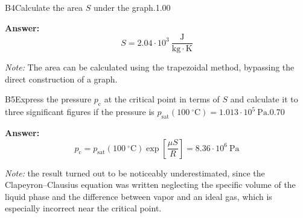 \documentclass[11pt,a4paper]{article}
\begin{document}
\begin{solcard}{B4}{Calculate the area $S$ under the graph.}{1.00}
\par\smallskip\noindent\textbf{Answer:} \[S=2.04\cdot10^3~\frac{\mathrm{J}}{\mathrm{kg}\cdot\mathrm{K}}\] 
\par\smallskip\noindent\textit{Note:} The area can be calculated using the trapezoidal method, bypassing the direct construction of a graph.
\end{solcard}

\begin{solcard}{B5}{Express the pressure $p_\mathrm c$ at the critical point in terms of $S$ and calculate it to three significant figures if the pressure is $p_\text{sat}(100~^\circ\mathrm{C})=1.013\cdot10^5~\text{Pa}$.}{0.70}
\par\smallskip\noindent\textbf{Answer:} 
\[p_\mathrm c=p_\text{sat}(100~^\circ\mathrm{C})\exp\left[{\frac{\mu S}{R}}\right]=8.36\cdot10^6~\mathrm{Pa}\] 
\par\smallskip\noindent\textit{Note:} the result turned out to be noticeably underestimated, since the Clapeyron–Clausius equation was written neglecting the specific volume of the liquid phase and the difference between vapor and an ideal gas, which is especially incorrect near the critical point.
\end{solcard}
\end{document}
